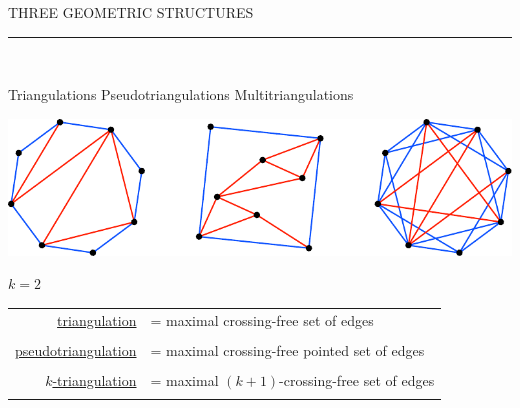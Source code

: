 \documentclass[12pt,titlepage,landscape,a4paper]{article}
\newcommand{\textemoyen}{\fontsize{23}{27}\selectfont}
\newenvironment{slide}[1]
{
\newpage
\begin{center}
{\blue \textemoyen \uppercase{#1}}\\
\end{center}
\vspace{-1cm}
\rule{\textwidth}{0.5 pt}\\
\vspace{-.8cm}
}
{\vspace*{-3cm}}
\newcommand{\blue}{\color{blue}} %
\renewcommand{\emph}[1]{\uline{#1}}
\begin{document}
\begin{slide}{Three geometric structures}

\hspace{1.6cm} Triangulations \hspace{3.4cm} Pseudotriangulations \hspace{2.5cm} Multitriangulations\\
\begin{center}\includegraphics[scale=1.9]{geometricStructures1}\end{center}
\vspace{-1.08cm} \hspace*{25.7cm} ${k=2}$

\bigskip
\begin{center}
\begin{tabular}{rl}
\emph{triangulation} & = maximal crossing-free set of edges \\
\vspace{.3cm}
\\

\emph{pseudotriangulation} & = maximal crossing-free pointed set of edges \\
\vspace{.3cm}
\\

\emph{$k$-triangulation} & = maximal $(k+1)$-crossing-free set of edges \\
\\
\end{tabular}
\end{center}
\end{slide}
\end{document}
